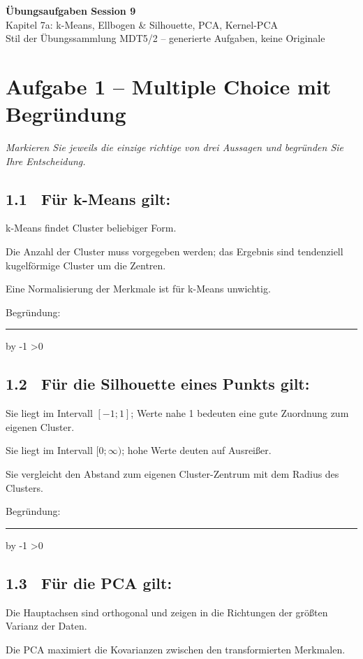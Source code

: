 \documentclass[10pt,a4paper]{article}
\newcommand{\mcbox}{\raisebox{-1pt}{\fbox{\rule{0pt}{7pt}\rule{7pt}{0pt}}}\hspace{6pt}}
\newcommand{\antwortlinien}[1]{%
  \par\vspace{2pt}%
  \newcount\zeilen \zeilen=#1
  \loop
    \noindent\rule{\linewidth}{0.4pt}\par\vspace{11pt}%
    \advance\zeilen by -1
  \ifnum\zeilen>0 \repeat
}
\begin{document}
\begin{center}
  {\Large\bfseries Übungsaufgaben Session 9}\\[4pt]
  {\large Kapitel 7a: k-Means, Ellbogen \& Silhouette, PCA, Kernel-PCA}\\[4pt]
  \small Stil der Übungssammlung MDT5/2 -- generierte Aufgaben, keine Originale
\end{center}

\vspace{4pt}

\section*{Aufgabe 1 -- Multiple Choice mit Begründung}
\emph{Markieren Sie jeweils die einzige richtige von drei Aussagen und begründen Sie Ihre Entscheidung.}

\subsection*{1.1 \ Für k-Means gilt:}
\mcbox k-Means findet Cluster beliebiger Form.

\mcbox Die Anzahl der Cluster muss vorgegeben werden; das Ergebnis sind tendenziell
kugelförmige Cluster um die Zentren.

\mcbox Eine Normalisierung der Merkmale ist für k-Means unwichtig.

Begründung:
\antwortlinien{2}

\subsection*{1.2 \ Für die Silhouette eines Punkts gilt:}
\mcbox Sie liegt im Intervall $[-1; 1]$; Werte nahe 1 bedeuten eine gute Zuordnung
zum eigenen Cluster.

\mcbox Sie liegt im Intervall $[0; \infty)$; hohe Werte deuten auf Ausreißer.

\mcbox Sie vergleicht den Abstand zum eigenen Cluster-Zentrum mit dem Radius des Clusters.

Begründung:
\antwortlinien{2}

\subsection*{1.3 \ Für die PCA gilt:}
\mcbox Die Hauptachsen sind orthogonal und zeigen in die Richtungen der größten Varianz
der Daten.

\mcbox Die PCA maximiert die Kovarianzen zwischen den transformierten Merkmalen.
\end{document}
